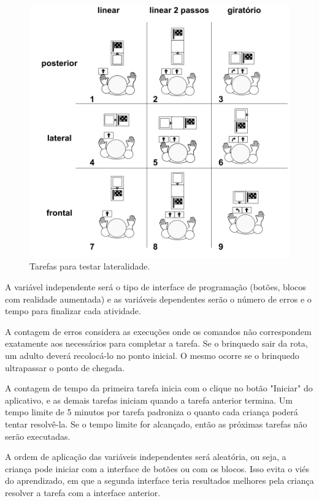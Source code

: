 \begin{figure}[!hbt]
    \centering
    \includegraphics[width=.9\textwidth,fbox]{figs/lateralidade.png}
    \caption{Tarefas para testar lateralidade.}
    \sourceauthor
    \label{fig:lateralidade}
\end{figure}

A variável independente será o tipo de interface de programação (botões, blocos com realidade aumentada) e as variáveis dependentes serão o número de erros e o tempo para finalizar cada atividade.  

A contagem de erros considera as execuções onde os comandos não correspondem exatamente aos necessários para completar a tarefa. Se o brinquedo sair da rota, um adulto deverá recolocá-lo no ponto inicial. O mesmo ocorre se o brinquedo ultrapassar o ponto de chegada.

A contagem de tempo da primeira tarefa inicia com o clique no botão "Iniciar" do aplicativo, e as demais tarefas iniciam quando a tarefa anterior termina. Um tempo limite de 5 minutos por tarefa padroniza o quanto cada criança poderá tentar resolvê-la. Se o tempo limite for alcançado, então as próximas tarefas não serão executadas.

A ordem de aplicação das variáveis independentes será aleatória, ou seja, a criança pode iniciar com a interface de botões ou com os blocos. Isso evita o viés do aprendizado, em que a segunda interface teria resultados melhores pela criança resolver a tarefa com a interface anterior.




